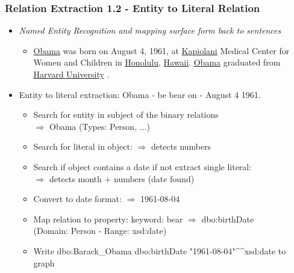 \documentclass{beamer}
\begin{document}
\begin{frame}
\frametitle{Relation Extraction 1.2 - Entity to Literal Relation}
\begin{example}
\begin{itemize}
	\item \textit{Named Entity Recognition and mapping surface form back to sentences} \\
	\begin{itemize} \item \underline{Obama} was born on August 4, 1961, at \underline{Kapiolani} Medical Center for Women and Children in \underline{Honolulu}, \underline{Hawaii}. \underline{Obama} graduated from \underline{Harvard University} .
	\end{itemize}
	\item Entity to literal extraction: Obama - be bear on - August 4 1961. \begin{itemize} \item Search for entity in subject of the binary relations \\ $\Rightarrow$ Obama (Types: Person, ...) 
		\item Search for literal in object: $\Rightarrow$ detects numbers 
		\item Search if object contains a date if not extract single literal: \\ $\Rightarrow$ detects month + numbers (date found)
		\item Convert to date format: $\Rightarrow$  1961-08-04
		\item Map relation to property: keyword: bear  $\Rightarrow$ dbo:birthDate \\ (Domain: Person - Range: xsd:date)
		\item Write dbo:Barack\_Obama dbo:birthDate "1961-08-04"\textasciicircum{}\textasciicircum{}xsd:date to graph
	\end{itemize}		 
\end{itemize}
\end{example}
\end{frame}
\end{document}

